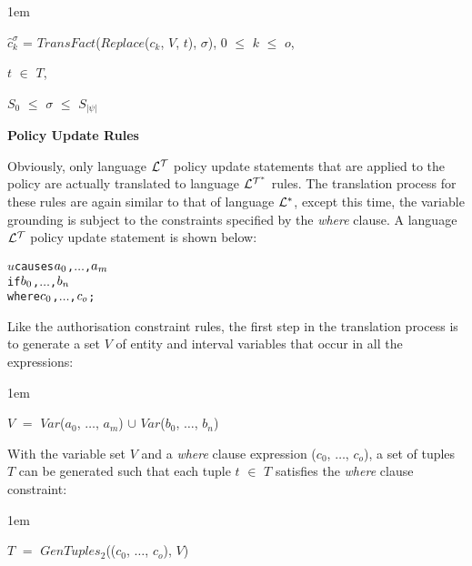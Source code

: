 \documentclass[11pt]{report}
\newenvironment{vverbatim}
{
  \begin{alltt}
}
{
  \vspace{-\baselineskip}
  \end{alltt}
}
\newenvironment{vquote}
{
  \begin{list}{}{\leftmargin 1em}\item[]
}
{
  \end{list}
}
\begin{document}
\begin{itemize}
\begin{vquote}
                \hspace{1em}
                $\hat{c}^{\sigma}_{k}$ = $TransFact$($Replace$($c_{k}$, $V$, $t$), $\sigma$),
                $0$ $\leq$ $k$ $\leq$ $o$,
    
                \hspace{1em}
                $t$ $\in$ $T$,

                \hspace{1em}
                $S_{0}$ $\leq$ $\sigma$ $\leq$ $S_{|\psi|}$
              \end{vquote}
            
            \item
              {\bf Policy Update Rules}

              Obviously, only language ${\cal L^T}$ policy update statements
              that are applied to the policy are actually translated to
              language ${\cal L^{T^*}}$ rules. The translation process for
              these rules are again similar to that of language ${\cal L^*}$,
              except this time, the variable grounding is subject to the
              constraints specified by the {\em where} clause. A language
              ${\cal L^T}$ policy update statement is shown below:

              \begin{vverbatim}
  \(u\) causes \(a\sb{0}\), \(\ldots\), \(a\sb{m}\)
  if \(b\sb{0}\), \(\ldots\), \(b\sb{n}\)
  where \(c\sb{0}\), \(\ldots\), \(c\sb{o}\);
              \end{vverbatim}

              \noindent
              Like the authorisation constraint rules, the first step in the
              translation process is to generate a set $V$ of entity and
              interval variables that occur in all the expressions:

              \begin{vquote}
                $V$ $=$
                $Var$($a_0$, $\ldots$, $a_m$) $\cup$
                $Var$($b_0$, $\ldots$, $b_n$)
              \end{vquote}

              \noindent
              With the variable set $V$ and a {\em where} clause expression
              ($c_0$, $\ldots$, $c_o$), a set of tuples $T$ can be generated
              such that each tuple $t$ $\in$ $T$ satisfies the {\em where}
              clause constraint:
            
              \begin{vquote}
                $T$ $=$
                $GenTuples_2$(($c_0$, $\ldots$, $c_o$), $V$)
              \end{vquote}


\end{itemize}
\end{document}
